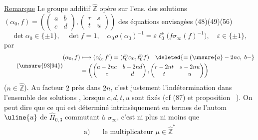 

\uline{Remarque} Le groupe additif $\widehat{\mathbb Z}$ opère sur l'ens.
des solutions
$(\alpha_0,f)=\left(\begin{pmatrix}a&b\\c&d\end{pmatrix},
\begin{pmatrix}r&s\\t&u\end{pmatrix}\right)$
des équations envisagées (48)(49)(56)
\[
\tag{93}
\det\alpha_0\in\{\pm1\},\quad\det f=1,\quad
\alpha_0\rho(\alpha_0)^{-1}
=\varepsilon\ell_0^{\nu}\bigl(f\sigma_\infty(f)^{-1}\bigr),
\quad\varepsilon\in\{\pm1\},
\]
par
\[
\tag{\unsure{93|94}}
\begin{aligned}
(\alpha_0,f)&\longmapsto(\alpha'_0,f')
=(\ell_0^n\alpha_0,\ell_0^nf)\quad\deleted{=(\unsure{a}-2nc,\ b-}\\
&=\left(\begin{pmatrix}a-2nc&b-2nd\\c&d\end{pmatrix},
\begin{pmatrix}r-2nt&s-2nu\\t&u\end{pmatrix}\right)
\end{aligned}
\]
($n\in\widehat{\mathbb Z}$).
Au facteur $2$ près dans $2n$, c'est justement l'indétermination dans
 l'ensemble des solutions , lorsque
$c,d,t,u$ sont fixés (cf (87) et proposition \ ).
On peut  dire que ce qui est déterminé
intrinsèquement 
en termes de l'autom  $\uline{u}$ de
$\widehat{\Pi}_{0,3}$ commutant à $\sigma_\infty$, c'est ni plus ni moins
que 
\[
\tag{95}
\begin{aligned}
\text{a)}\quad&\text{le multiplicateur }\mu\in\widehat{\mathbb Z}^{*}
\end{aligned}
\]

